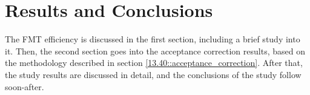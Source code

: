 \section{Results and Conclusions}
\label{14::results_and_conclusions}
    The FMT efficiency is discussed in the first section, including a brief study into it.
    Then, the second section goes into the acceptance correction results, based on the methodology described in section \ref{13.40::acceptance_correction}.
    After that, the study results are discussed in detail, and the conclusions of the study follow soon-after.

    
    

%
